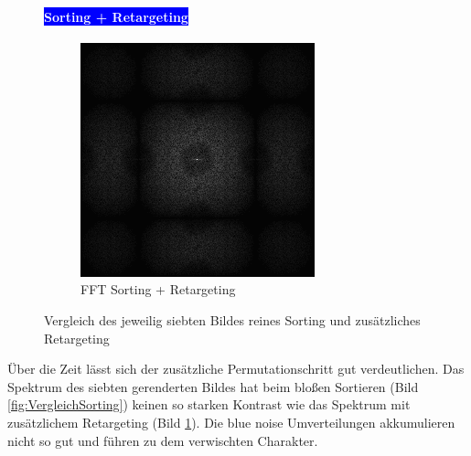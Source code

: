 \begin{figure}[H]
\begin{tcolorbox}[sidebyside,title=Vergleich mit/ohne Retargeting]
    \paragraph{\hfill\colorbox{blue}{\textcolor{white}{Sorting + Retargeting}}}
        \centering
        \begin{subfigure}{0.5\textwidth}
            \centering\includegraphics[width=\linewidth]{content/TemporalerAlg/Bilder/Retargeting/Spektren/Ausschnitt7.png}
            \caption{FFT Sorting + Retargeting}
            \label{fig:VergleichRetargeting}
        \end{subfigure}
    \end{tcolorbox}
    \caption{Vergleich des jeweilig siebten Bildes reines Sorting und zusätzliches Retargeting}
    \label{fig:VergleichBild7}
\end{figure}

Über die Zeit lässt sich der zusätzliche Permutationschritt gut verdeutlichen. Das Spektrum des siebten gerenderten Bildes 
hat beim bloßen Sortieren (Bild \ref{fig:VergleichSorting}) keinen so starken Kontrast wie das Spektrum mit 
zusätzlichem Retargeting (Bild \ref{fig:VergleichRetargeting}). Die blue noise Umverteilungen akkumulieren nicht so gut 
und führen zu dem verwischten Charakter. 